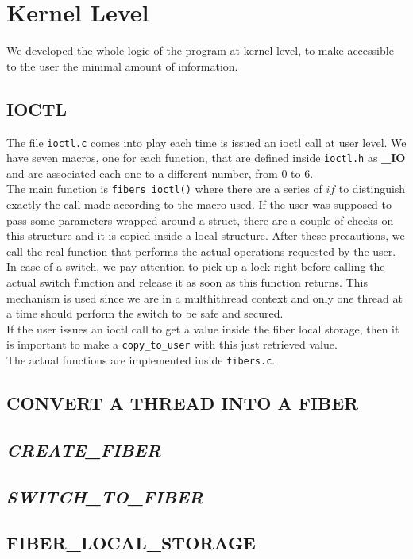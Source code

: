\documentclass[a4paper]{article}
\begin{document}
\section{Kernel Level}
We developed the whole logic of the program at kernel level, to make accessible to the user the minimal amount of information.

\subsection*{IOCTL}
The file \texttt{ioctl.c} comes into play each time is issued an ioctl call at user level. We have seven macros, one for each function, that are defined inside \texttt{ioctl.h} as \textbf{\_IO} and are associated each one to a different number, from 0 to 6.\bigskip\\
The main function is \texttt{fibers\_ioctl()} where there are a series of $if$ to distinguish exactly the call made according to the macro used. If the user was supposed to pass some parameters wrapped around a struct, there are a couple of checks on this structure and it is copied inside a local structure. After these precautions, we call the real function that performs the actual operations requested by the user.\bigskip\\
In case of a switch, we pay attention to pick up a lock right before calling the actual switch function and release it as soon as this function returns. This mechanism is used since we are in a multhithread context and only one thread at a time should perform the switch to be safe and secured.\bigskip\\
If the user issues an ioctl call to get a value inside the fiber local storage, then it is important to make a \texttt{copy\_to\_user} with this just retrieved value.\bigskip\\
The actual functions are implemented inside \texttt{fibers.c}.

\subsection*{CONVERT A THREAD INTO A FIBER}
\subsection*{\textit{CREATE\_FIBER}}
\subsection*{\textit{SWITCH\_TO\_FIBER}}
\subsection*{FIBER\_LOCAL\_STORAGE}
\end{document}
